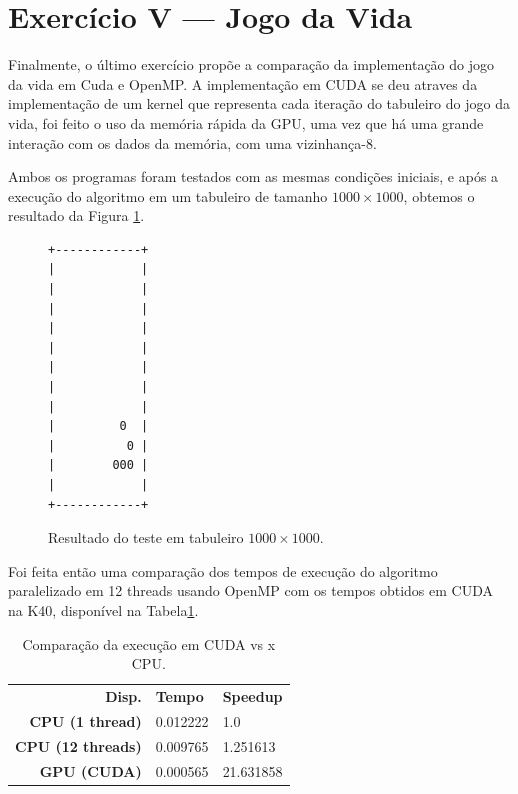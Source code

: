 \documentclass[conference]{IEEEtran}
\begin{document}
\section{Exercício V --- Jogo da Vida}
Finalmente, o último exercício propõe a comparação da implementação do jogo da vida em Cuda e OpenMP.
A implementação em CUDA se deu atraves da implementação de um kernel que representa cada iteração do tabuleiro do jogo da vida, foi feito o uso da memória rápida da GPU, uma vez que há uma grande interação com os dados da memória, com uma vizinhança-8.

Ambos os programas foram testados com as mesmas condições iniciais, e após a execução do algoritmo em um tabuleiro de tamanho $1000\times1000$, obtemos o resultado da Figura \ref{fig:ex05}.

\begin{figure}[!htb]
\begin{verbatim}
+------------+
|            |
|            |
|            |
|            |
|            |
|            |
|            |
|            |
|         0  |
|          0 |
|        000 |
|            |
+------------+
\end{verbatim}
\caption{Resultado do teste em tabuleiro $1000\times1000$.}
\label{fig:ex05}
\end{figure}

Foi feita então uma comparação dos tempos de execução do algoritmo paralelizado em 12 threads usando OpenMP com os tempos obtidos em CUDA na K40, disponível na Tabela\ref{tab:ex05}.

\begin{table}[htb!]
\centering
\begin{tabular}{rll}
  \bfseries Disp. & \bfseries Tempo & \bfseries Speedup \\
  \bfseries CPU (1 thread)   & 0.012222 & 1.0 \\
  \bfseries CPU (12 threads) & 0.009765 & 1.251613 \\
  \bfseries GPU (CUDA)       & 0.000565 & 21.631858 \\
\end{tabular}
\caption{Comparação da execução em CUDA vs x CPU.\label{tab:ex05}}
\end{table}
\end{document}
